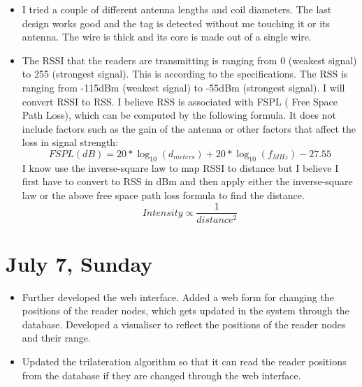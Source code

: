 \documentclass[a4paper,12pt]{article}
\begin{document}
\begin{itemize}
	\item I tried a couple of different antenna lengths and coil diameters. The last design works good and the tag is detected without me touching it or its antenna. The wire is thick and its core is made out of a single wire.
	\item The RSSI that the readers are transmitting is ranging from 0 (weakest signal) to 255 (strongest signal). This is according to the specifications. The RSS is ranging from -115dBm (weakest signal) to -55dBm (strongest signal). I will convert RSSI to RSS. I believe RSS is associated with FSPL ( Free Space Path Loss), which can be computed by the following formula. It does not include factors such as the gain of the antenna or other factors that affect the loss in signal strength:
	\[ FSPL(dB) = 20*\log_{10}(d_{meters}) + 20*\log_{10}(f_{MHz}) - 27.55 \]
	I know use the inverse-square law to map RSSI to distance but I believe I first have to convert to RSS in dBm and then apply either the inverse-square law or the above free space path loss formula to find the distance.
	\[ Intensity \propto \frac{1}{distance^{2}} \]
	 
\end{itemize}

\section{July 7, Sunday}

\begin{itemize}
	\item Further developed the web interface. Added a web form for changing the positions of the reader nodes, which gets updated in the system through the database. Developed a visualiser to reflect the positions of the reader nodes and their range.
	\item Updated the trilateration algorithm so that it can read the reader positions from the database if they are changed through the web interface.
\end{itemize}

\newpage


\end{document}
